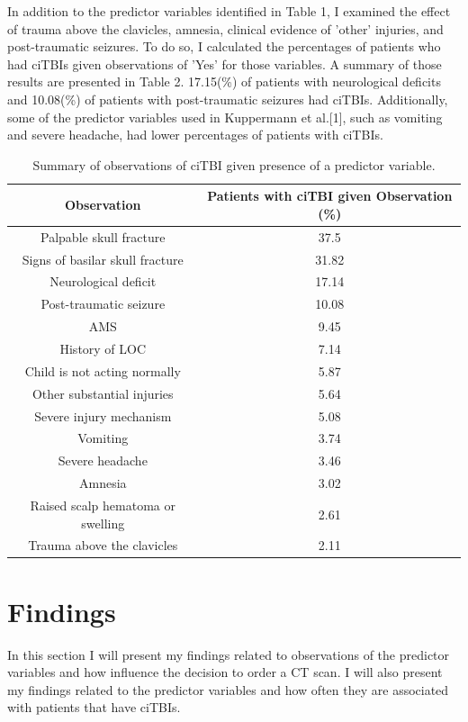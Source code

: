 \documentclass[10pt,letterpaper]{article}
\begin{document}
In addition to the predictor variables identified in Table 1, I examined the effect of trauma above the clavicles, amnesia, clinical evidence of 'other' injuries, and post-traumatic seizures. To do so, I calculated the percentages of patients who had ciTBIs given observations of 'Yes' for those variables. A summary of those results are presented in Table 2. 17.15(\%) of patients with neurological deficits and  10.08(\%) of patients with post-traumatic seizures had ciTBIs. Additionally, some of the predictor variables used in Kuppermann et al.[1], such as vomiting and severe headache, had lower percentages of patients with ciTBIs.
\begin{table}[H]
    \centering
    \centering    \caption{Summary of observations of ciTBI given presence of a predictor variable.}
    \renewcommand{\arraystretch}{1.1} 
    \begin{tabular}{|c|c|}\hline
         Observation& Patients with ciTBI given Observation (\%)\\\hline
         Palpable skull fracture& 37.5\\\hline
         Signs of basilar skull
fracture& 31.82\\\hline
         Neurological deficit& 17.14\\\hline
         Post-traumatic seizure& 10.08\\\hline
         AMS& 9.45\\\hline
         History of LOC & 7.14\\\hline
         Child is not acting normally& 5.87\\\hline
         Other substantial injuries& 5.64\\\hline
         Severe injury mechanism& 5.08\\\hline
 Vomiting&3.74\\\hline
 Severe headache&3.46\\\hline
 Amnesia&3.02\\\hline
 Raised scalp hematoma or swelling&2.61\\\hline
 Trauma above the clavicles&2.11\\ \hline
    \end{tabular}

    \label{tab:placeholder}
\end{table}
\section{Findings}\label{findings}

In this section I will present my findings related to observations of the predictor variables and how influence the decision to order a CT scan. I will also present my findings related to the predictor variables and how often they are associated with patients that have ciTBIs. 
\end{document}
